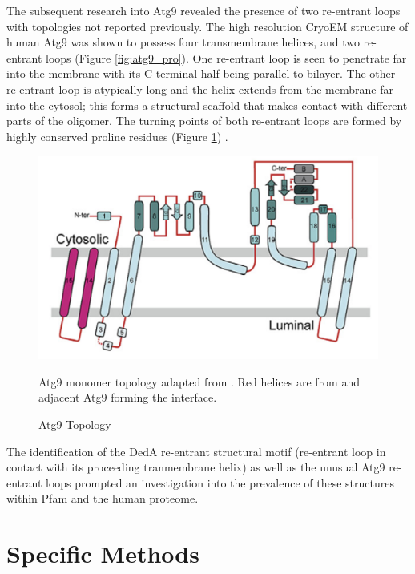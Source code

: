 The subsequent research into Atg9 revealed the presence of two re-entrant loops with topologies not reported previously.  The high resolution CryoEM structure of human Atg9 was shown to possess four transmembrane helices, and two re-entrant loops (Figure \ref{fig:atg9_pro}).  One re-entrant loop is seen to penetrate far into the membrane with its C-terminal half being parallel to bilayer. The other re-entrant loop is atypically long and the helix extends from the membrane far into the cytosol; this forms a structural scaffold that makes contact with different parts of the oligomer.  The turning points of both re-entrant loops are formed by highly conserved proline residues (Figure \ref{fig:atg9_top})  \cite{guardia2020structure}. 

\begin{figure}[th!]
    \centering
\includegraphics[width=\linewidth]{Pfam/atg9_topo.png}
    \caption{Atg9 Topology}
    \label{fig:atg9_top}
    \small
    Atg9 monomer topology adapted from \cite{guardia2020structure}. Red helices are from and adjacent Atg9 forming the interface. 
\end{figure}


The identification of the DedA re-entrant structural motif (re-entrant loop in contact with its proceeding tranmembrane helix) as well as the unusual Atg9 re-entrant loops prompted an investigation into the prevalence of these structures within Pfam \cite{El-Gebali2019} and the human proteome.




\section{Specific Methods}

